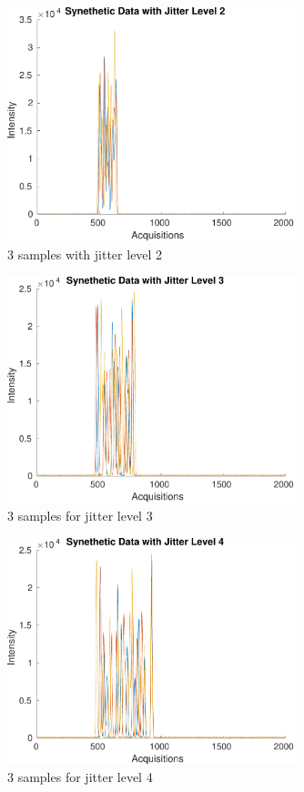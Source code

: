 \documentclass[preprint,12pt]{elsarticle}
\begin{document}
\begin{figure}[h]
    \centering
    \includegraphics[width=0.75\textwidth]{figures/jitter_illustration2.pdf}
    \caption{3 samples with jitter level 2}
    \label{fig:afigure2}
\end{figure}

\begin{figure}[h]
    \centering
    \includegraphics[width=0.75\textwidth]{figures/jitter_illustration3.pdf}
    \caption{3 samples for jitter level 3}
    \label{fig:afigure3}
\end{figure}

\begin{figure}[h]
    \centering
    \includegraphics[width=0.75\textwidth]{figures/jitter_illustration4.pdf}
    \caption{3 samples for jitter level 4}
    \label{fig:afigure4}
\end{figure}
\end{document}
